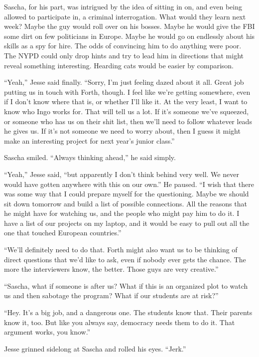 \documentclass[12pt]{book}
\begin{document}
Sascha, for his part, was intrigued by the idea of sitting in on, and even being allowed to participate in, a criminal interrogation.  What would they learn next week?  Maybe the guy would roll over on his bosses.  Maybe he would give the FBI some dirt on few politicians in Europe.  Maybe he would go on endlessly about his skills as a spy for hire.  The odds of convincing him to do anything were poor.  The NYPD could only drop hints and try to lead him in directions that might reveal something interesting.  Hearding cats would be easier by comparison.

``Yeah,'' Jesse said finally.  ``Sorry, I'm just feeling dazed about it all.  Great job putting us in touch with Forth, though.  I feel like we're getting somewhere, even if I don't know where that is, or whether I'll like it.  At the very least, I want to know who Ingo works for.  That will tell us a lot.  If it's someone we've squeezed, or someone who has us on their shit list, then we'll need to follow whatever leads he gives us.  If it's not someone we need to worry about, then I guess it might make an interesting project for next year's junior class.''

Sascha smiled.  ``Always thinking ahead,'' he said simply.

``Yeah,'' Jesse said, ``but apparently I don't think behind very well.  We never would have gotten anywhere with this on our own.''  He paused.  ``I wish that there was some way that I could prepare myself for the questioning.  Maybe we should sit down tomorrow and build a list of possible connections.  All the reasons that he might have for watching us, and the people who might pay him to do it.  I have a list of our projects on my laptop, and it would be easy to pull out all the one that touched European countries.''

``We'll definitely need to do that.  Forth might also want us to be thinking of direct questions that we'd like to ask, even if nobody ever gets the chance.  The more the interviewers know, the better.  Those guys are very creative.''

``Sascha, what if someone is after us?  What if this is an organized plot to watch us and then sabotage the program?  What if our students are at risk?''

``Hey.  It's a big job, and a dangerous one.  The students know that.  Their parents know it, too.  But like you always say, democracy needs them to do it.  That argument works, you know.''

Jesse grinned sidelong at Sascha and rolled his eyes.  ``Jerk.''
\end{document}
